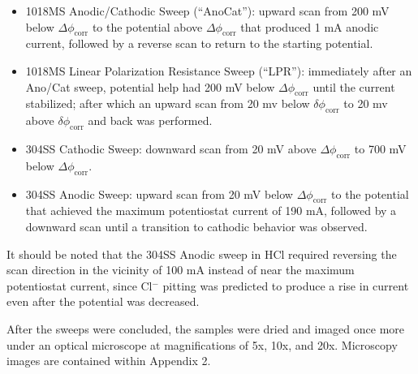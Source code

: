 \begin{itemize}

	\item 1018MS Anodic/Cathodic Sweep (``AnoCat''): upward scan from 200 mV below $\Delta \phi_{\text{corr}}$ to the potential above $\Delta \phi_{\text{corr}}$ that produced 1 mA anodic current, followed by a reverse scan to return to the starting potential.
	\item 1018MS Linear Polarization Resistance Sweep (``LPR''): immediately after an Ano/Cat sweep, potential help had 200 mV below $\Delta \phi_{\text{corr}}$ until the current stabilized; after which an upward scan from 20 mv below $\delta \phi_{\text{corr}}$ to 20 mv above $\delta \phi_{\text{corr}}$ and back was performed.
	\item 304SS Cathodic Sweep: downward scan from 20 mV above $\Delta \phi_{\text{corr}}$ to 700 mV below $\Delta \phi_{\text{corr}}$.
	\item 304SS Anodic Sweep: upward scan from 20 mV below $\Delta \phi_{\text{corr}}$ to the potential that achieved the maximum potentiostat current of 190 mA, followed by a downward scan until a transition to cathodic behavior was observed.\cite{labguide}

\end{itemize}

It should be noted that the 304SS Anodic sweep in HCl required reversing the scan direction in the vicinity of 100 mA instead of near the maximum potentiostat current, since Cl$^-$ pitting was predicted to produce a rise in current even after the potential was decreased.\cite{labguide}

After the sweeps were concluded, the samples were dried and imaged once more under an optical microscope at magnifications of 5x, 10x, and 20x.  Microscopy images are contained within Appendix 2.

